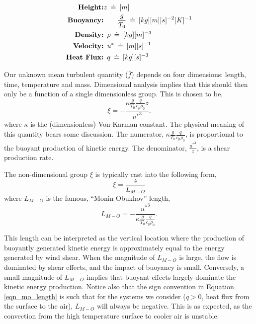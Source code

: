 \begin{eqnarray}
 \textbf{Height:}& z\enskip \dot = \enskip [m]  \\
 \textbf{Buoyancy:}& \qquad \frac{g}{T_0}\enskip \dot = \enskip [kg] [m] [s]^{-2}
  [K]^{-1} \\ 
 \textbf{Density:}&  \enskip \rho \enskip \dot = \enskip [kg] [m]^{-3}  \\
 \textbf{Velocity:}& \enskip u^* \enskip \dot = \enskip [m] [s]^{-1} \\
 \textbf{Heat Flux:}& \enskip q \enskip \dot = \enskip [kg] [s]^{-3} 
\end{eqnarray}

Our unknown mean turbulent quantity ($\bar f$) depends on four
dimensions: length, time, temperature and mass. Dimensional analysis
implies that this should then only be a function of a single dimensionless
group\cite{munson2012fundamentals}. This is chosen to be,
\begin{equation}
 \xi = -\frac{\kappa \frac{g}{T_0} \frac{q}{c_p \rho_0} z}{ {u^*}^3}.
\end{equation}
where $\kappa$ is the (dimensionless) Von-Karman constant. 
The physical meaning of this quantity bears some discussion.  
The numerator, $\kappa \frac{g}{T_0} \frac{q}{c_p \rho_0} $, is
proportional to the buoyant production of kinetic energy.  The
denominator, $\frac{{u^*}^3}{z}$, is a shear production rate. 

The non-dimensional group $\xi$ is typically cast into the following 
form, 
\begin{equation}
 \xi = \frac{z}{L_{M-O}}
\end{equation}
where $L_{M-O}$ is the famous, ``Monin-Obukhov'' length,
\begin{equation}
 L_{M-O} = -\frac{{u^*}^3}{\kappa \frac{g}{T_0} \frac{q}{c_p \rho_0}}. 
  \label{eqn_mo_length}
\end{equation}

This length can be interpreted as the vertical location
where the production of buoyantly generated kinetic energy is
approximately equal to the energy generated by wind shear. When the
magnitude of $L_{M-O}$ is large, the flow is dominated by shear effects,
and the impact of buoyancy is small. Conversely, a small magnitude of
$L_{M-O}$ implies that buoyant effects largely dominate the kinetic
energy production. Notice also that the sign convention in Equation
\ref{eqn_mo_length} is such that for the systems we consider ($q > 0$, heat
flux from the surface to the air), $L_{M-O}$ will always be
negative. This is as expected, as the convection from the high
temperature surface to cooler air is unstable. 

